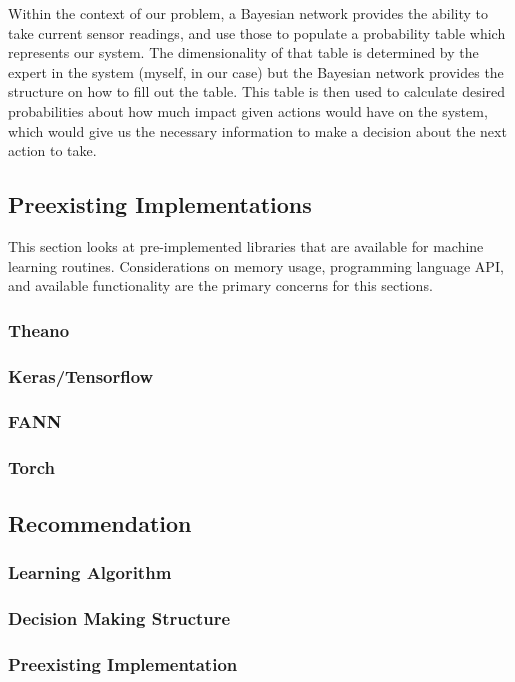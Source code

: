 Within the context of our problem, a Bayesian network provides the ability to take current sensor readings, and use those to populate a probability table which represents our system.
The dimensionality of that table is determined by the expert in the system (myself, in our case) but the Bayesian network provides the structure on how to fill out the table.
This table is then used to calculate desired probabilities about how much impact given actions would have on the system, which would give us the necessary information to make a decision about the next action to take.

\subsection{Preexisting Implementations}
This section looks at pre-implemented libraries that are available for machine learning routines.
Considerations on memory usage, programming language API, and available functionality are the primary concerns for this sections.
\subsubsection{Theano}
\subsubsection{Keras/Tensorflow}
\subsubsection{FANN}
\subsubsection{Torch}

\subsection{Recommendation}
\subsubsection{Learning Algorithm}
\subsubsection{Decision Making Structure}
\subsubsection{Preexisting Implementation}


\newpage





